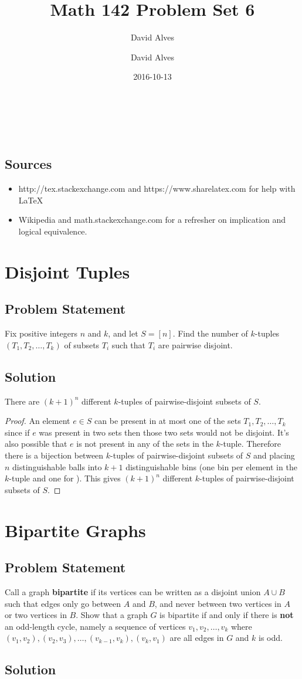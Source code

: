 \documentclass[12pt]{article}
\author{David Alves}
\title{Math 142 Problem Set 6}
\author{David Alves}
\date{2016-10-13}
\newcommand{\ProblemStatement}[1]{
\subsection*{Problem Statement}
#1
\subsection*{Solution}
}
\begin{document}

\begin{center}
\large \thetitle \\
\theauthor \\
\thedate
\end{center}

\subsection*{Sources}

    \begin{itemize}
    \item http://tex.stackexchange.com and https://www.sharelatex.com for help with \LaTeX
    \item Wikipedia and math.stackexchange.com for a refresher on implication and logical equivalence.
    \end{itemize}

\section{Disjoint Tuples}
\ProblemStatement{
Fix positive integers $n$ and $k$, and let $S = [n]$. Find the number of $k$-tuples $(T_1, T_2, \ldots, T_k)$ of subsets $T_i$ such that $T_i$ are pairwise disjoint.
}

There are $(k+1)^{n}$ different $k$-tuples of pairwise-disjoint subsets of $S$.

\begin{proof}
An element $e \in S$ can be present in at most one of the sets $T_1, T_2, \ldots, T_k$ since if $e$ was present in two sets then those two sets would not be disjoint. It's also possible that $e$ is not present in any of the sets in the $k$-tuple. Therefore there is a bijection between $k$-tuples of pairwise-disjoint subsets of $S$ and placing $n$ distinguishable balls into $k+1$ distinguishable bins (one bin per element in the $k$-tuple and one for ). This gives $(k+1)^{n}$ different $k$-tuples of pairwise-disjoint subsets of $S$.
\end{proof}

\section{Bipartite Graphs}
\ProblemStatement{
Call a graph \textbf{bipartite} if its vertices can be written as a disjoint
union $A \cup B$ such that edges only go between $A$ and $B$, and never between
two vertices in $A$ or two vertices in $B$. Show that a graph $G$ is bipartite if and only if there is \textbf{not} an odd-length cycle, namely a sequence of vertices $v_1, v_2, \ldots, v_k$ where $(v_1, v_2), (v_2, v_3), \ldots, (v_{k-1}, v_k), (v_k, v_1)$ are all edges in $G$ and $k$ is odd.
}
\end{document}
